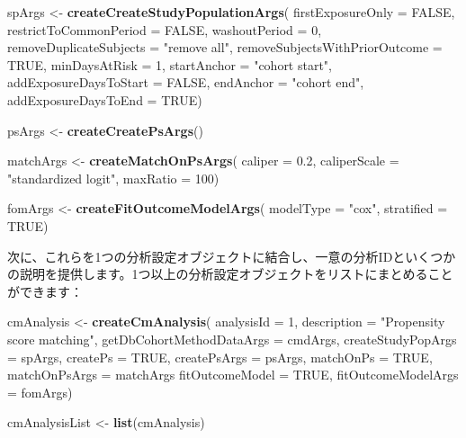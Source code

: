 \documentclass[
  11pt]{book}
\newenvironment{Shaded}{\begin{snugshade}}{\end{snugshade}}
\newcommand{\AttributeTok}[1]{\textcolor[rgb]{0.13,0.29,0.53}{#1}}
\newcommand{\ConstantTok}[1]{\textcolor[rgb]{0.56,0.35,0.01}{#1}}
\newcommand{\DecValTok}[1]{\textcolor[rgb]{0.00,0.00,0.81}{#1}}
\newcommand{\FloatTok}[1]{\textcolor[rgb]{0.00,0.00,0.81}{#1}}
\newcommand{\FunctionTok}[1]{\textcolor[rgb]{0.13,0.29,0.53}{\textbf{#1}}}
\newcommand{\NormalTok}[1]{#1}
\newcommand{\OtherTok}[1]{\textcolor[rgb]{0.56,0.35,0.01}{#1}}
\newcommand{\StringTok}[1]{\textcolor[rgb]{0.31,0.60,0.02}{#1}}
\theoremstyle{definition}
\theoremstyle{definition}
\theoremstyle{definition}
\theoremstyle{definition}
\theoremstyle{remark}
\begin{document}
\begin{Shaded}
\begin{Highlighting}[]
\NormalTok{spArgs }\OtherTok{\textless{}{-}} \FunctionTok{createCreateStudyPopulationArgs}\NormalTok{(}
  \AttributeTok{firstExposureOnly =} \ConstantTok{FALSE}\NormalTok{,}
  \AttributeTok{restrictToCommonPeriod =} \ConstantTok{FALSE}\NormalTok{,}
  \AttributeTok{washoutPeriod =} \DecValTok{0}\NormalTok{,}
  \AttributeTok{removeDuplicateSubjects =} \StringTok{"remove all"}\NormalTok{,}
  \AttributeTok{removeSubjectsWithPriorOutcome =} \ConstantTok{TRUE}\NormalTok{,}
  \AttributeTok{minDaysAtRisk =} \DecValTok{1}\NormalTok{,}
  \AttributeTok{startAnchor =} \StringTok{"cohort start"}\NormalTok{,}
  \AttributeTok{addExposureDaysToStart =} \ConstantTok{FALSE}\NormalTok{,}
  \AttributeTok{endAnchor =} \StringTok{"cohort end"}\NormalTok{,}
  \AttributeTok{addExposureDaysToEnd =} \ConstantTok{TRUE}\NormalTok{)}

\NormalTok{psArgs }\OtherTok{\textless{}{-}} \FunctionTok{createCreatePsArgs}\NormalTok{()}

\NormalTok{matchArgs }\OtherTok{\textless{}{-}} \FunctionTok{createMatchOnPsArgs}\NormalTok{(}
  \AttributeTok{caliper =} \FloatTok{0.2}\NormalTok{,}
  \AttributeTok{caliperScale =} \StringTok{"standardized logit"}\NormalTok{,}
  \AttributeTok{maxRatio =} \DecValTok{100}\NormalTok{)}

\NormalTok{fomArgs }\OtherTok{\textless{}{-}} \FunctionTok{createFitOutcomeModelArgs}\NormalTok{(}
  \AttributeTok{modelType =} \StringTok{"cox"}\NormalTok{,}
  \AttributeTok{stratified =} \ConstantTok{TRUE}\NormalTok{)}
\end{Highlighting}
\end{Shaded}

次に、これらを1つの分析設定オブジェクトに結合し、一意の分析IDといくつかの説明を提供します。1つ以上の分析設定オブジェクトをリストにまとめることができます：

\begin{Shaded}
\begin{Highlighting}[]
\NormalTok{cmAnalysis }\OtherTok{\textless{}{-}} \FunctionTok{createCmAnalysis}\NormalTok{(}
  \AttributeTok{analysisId =} \DecValTok{1}\NormalTok{,}
  \AttributeTok{description =} \StringTok{"Propensity score matching"}\NormalTok{,}
  \AttributeTok{getDbCohortMethodDataArgs =}\NormalTok{ cmdArgs,}
  \AttributeTok{createStudyPopArgs =}\NormalTok{ spArgs,}
  \AttributeTok{createPs =} \ConstantTok{TRUE}\NormalTok{,}
  \AttributeTok{createPsArgs =}\NormalTok{ psArgs,}
  \AttributeTok{matchOnPs =} \ConstantTok{TRUE}\NormalTok{,}
  \AttributeTok{matchOnPsArgs =}\NormalTok{ matchArgs}
  \AttributeTok{fitOutcomeModel =} \ConstantTok{TRUE}\NormalTok{,}
  \AttributeTok{fitOutcomeModelArgs =}\NormalTok{ fomArgs)}

\NormalTok{cmAnalysisList }\OtherTok{\textless{}{-}} \FunctionTok{list}\NormalTok{(cmAnalysis)}
\end{Highlighting}
\end{Shaded}
\end{document}
